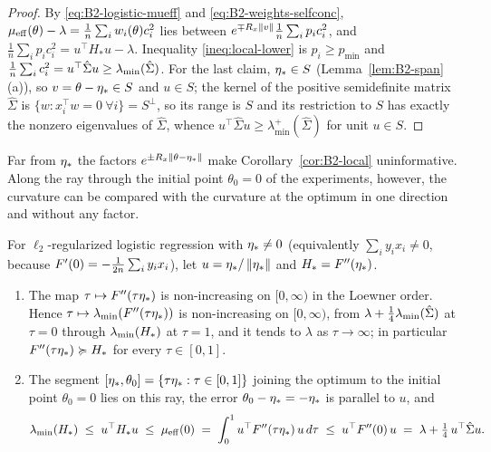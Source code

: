 \begin{proof}
By \eqref{eq:B2-logistic-mueff} and \eqref{eq:B2-weights-selfconc},
$\mu_{\mathrm{eff}}(\theta)-\lambda=\frac1n\sum_iw_i(\theta)c_i^2$ lies between $e^{\mp R_x\left\|v\right\|}\frac1n\sum_ip_ic_i^2$,
and $\frac1n\sum_ip_ic_i^2=u^\top H_\ast u-\lambda$. Inequality \eqref{ineq:local-lower} is $p_i\ge p_{\min}$
and $\frac1n\sum_ic_i^2=u^\top\hat\Sigma u\ge\lambda_{\min}(\hat\Sigma)$. For the last claim, $\eta_\ast\in S$
(Lemma~\ref{lem:B2-span}(a)), so $v=\theta-\eta_\ast\in S$ and $u\in S$; the kernel of the positive semidefinite matrix
$\hat\Sigma$ is $\{w:x_i^\top w=0\ \forall i\}=S^\perp$, so its range is $S$ and its restriction to $S$ has exactly the
nonzero eigenvalues of $\hat\Sigma$, whence $u^\top\hat\Sigma u\ge\lambda^+_{\min}(\hat\Sigma)$ for unit $u\in S$.
\end{proof}

Far from $\eta_\ast$ the factors $e^{\pm R_x\left\|\theta-\eta_\ast\right\|}$ make Corollary~\ref{cor:B2-local} uninformative. Along
the ray through the initial point $\theta_0=0$ of the experiments, however, the curvature can be compared with the
curvature at the optimum in one direction and without any factor.

\begin{remark}[curvature along the ray through $\theta_0=0$]\label{rem:B2-ray}
For $\ell_2$-regularized logistic regression with $\eta_\ast\neq0$ (equivalently $\sum_iy_ix_i\neq0$, because
$F'(0)=-\frac1{2n}\sum_iy_ix_i$), let $u=\eta_\ast/\left\|\eta_\ast\right\|$ and $H_\ast=F''(\eta_\ast)$.
\begin{enumerate}[label=(\alph*)]
\item The map $\tau\mapsto F''(\tau\eta_\ast)$ is non-increasing on $[0,\infty)$ in the Loewner order. Hence
$\tau\mapsto\lambda_{\min}(F''(\tau\eta_\ast))$ is non-increasing on $[0,\infty)$, from $\lambda+\frac14\lambda_{\min}(\hat\Sigma)$ at
$\tau=0$ through $\lambda_{\min}(H_\ast)$ at $\tau=1$, and it tends to $\lambda$ as $\tau\to\infty$; in particular
$F''(\tau\eta_\ast)\succcurlyeq H_\ast$ for every $\tau\in[0,1]$.
\item The segment $[\eta_\ast,\theta_0]=\{\tau\eta_\ast:\tau\in[0,1]\}$ joining the optimum to the initial point
$\theta_0=0$ lies on this ray, the error $\theta_0-\eta_\ast=-\eta_\ast$ is parallel to $u$, and
\[
\lambda_{\min}(H_\ast)\;\le\;u^\top H_\ast u\;\le\;\mu_{\mathrm{eff}}(0)\;=\;\int_0^1u^\top F''(\tau\eta_\ast)\,u\,d\tau\;\le\;
u^\top F''(0)\,u\;=\;\lambda+\tfrac14\,u^\top\hat\Sigma u .
\]
\end{enumerate}
\end{remark}

